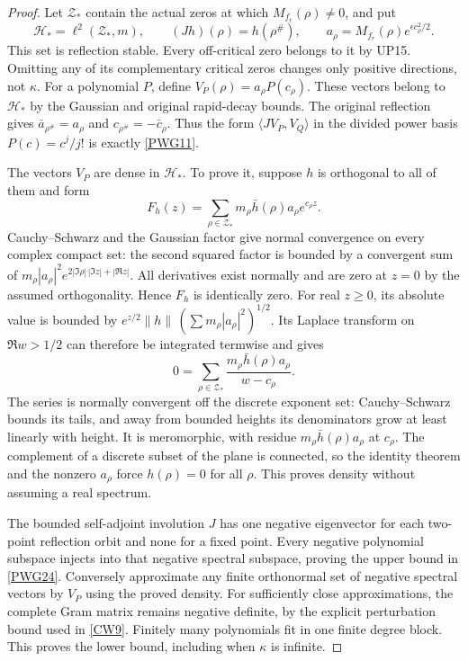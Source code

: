 \documentclass[11pt,a4paper]{article}
\theoremstyle{definition}\newtheorem{definition}[theorem]{Definition}
\begin{document}
\begin{proof}
Let $\mathcal Z_*$ contain the actual zeros at which $M_{f_r}(\rho)\ne0$, and put
\[
 \mathcal H_* =\ell^2(\mathcal Z_*,m),\qquad
 (Jh)(\rho)=h(\rho^\#),\qquad
 a_\rho=M_{f_r}(\rho)e^{\epsilon c_\rho^2/2}.
\]
This set is reflection stable. Every off-critical zero belongs to it by UP15. Omitting any of its complementary critical zeros changes only positive directions, not $\kappa$. For a polynomial $P$, define $V_P(\rho)=a_\rho P(c_\rho)$. These vectors belong to $\mathcal H_*$ by the Gaussian and original rapid-decay bounds. The original reflection gives $\bar a_{\rho^\#}=a_\rho$ and $c_{\rho^\#}=-\bar c_\rho$. Thus the form $\langle JV_P,V_Q\rangle$ in the divided power basis $P(c)=c^j/j!$ is exactly \eqref{PWG11}.

The vectors $V_P$ are dense in $\mathcal H_*$. To prove it, suppose $h$ is orthogonal to all of them and form
\[
 F_h(z)=\sum_{\rho\in\mathcal Z_*}m_\rho\bar h(\rho)a_\rho e^{c_\rho z}.
\]
Cauchy--Schwarz and the Gaussian factor give normal convergence on every complex compact set: the second squared factor is bounded by a convergent sum of $m_\rho|a_\rho|^2e^{2|\Im\rho|\,|\Im z|+|\Re z|}$. All derivatives exist normally and are zero at $z=0$ by the assumed orthogonality. Hence $F_h$ is identically zero. For real $z\ge0$, its absolute value is bounded by
$e^{z/2}\|h\|\,(\sum m_\rho|a_\rho|^2)^{1/2}$.
Its Laplace transform on $\Re w>1/2$ can therefore be integrated termwise and gives
\[
 0=\sum_{\rho\in\mathcal Z_*}
       \frac{m_\rho\bar h(\rho)a_\rho}{w-c_\rho}.
\]
The series is normally convergent off the discrete exponent set: Cauchy--Schwarz bounds its tails, and away from bounded heights its denominators grow at least linearly with height. It is meromorphic, with residue $m_\rho\bar h(\rho)a_\rho$ at $c_\rho$. The complement of a discrete subset of the plane is connected, so the identity theorem and the nonzero $a_\rho$ force $h(\rho)=0$ for all $\rho$. This proves density without assuming a real spectrum.

The bounded self-adjoint involution $J$ has one negative eigenvector for each two-point reflection orbit and none for a fixed point. Every negative polynomial subspace injects into that negative spectral subspace, proving the upper bound in \eqref{PWG24}. Conversely approximate any finite orthonormal set of negative spectral vectors by $V_P$ using the proved density. For sufficiently close approximations, the complete Gram matrix remains negative definite, by the explicit perturbation bound used in \eqref{CW9}. Finitely many polynomials fit in one finite degree block. This proves the lower bound, including when $\kappa$ is infinite.
\end{proof}
\end{document}
